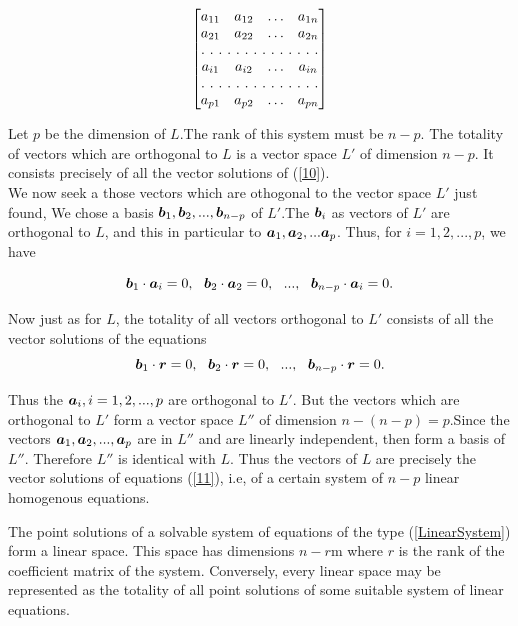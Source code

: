 \[
\begin{bmatrix}
a_{11} & a_{12}  & \hdots & a_{1n} \\
a_{21} & a_{22}  & \hdots & a_{2n} \\
\hdotsfor[2]{4}\\
a_{i1} & a_{i2}  & \hdots & a_{in}  \\
\hdotsfor[2]{4}\\
a_{p1} & a_{p2}  & \hdots & a_{pn}\\
\end{bmatrix}
\]

Let $p$ be the dimension of $L$.The rank of this system must be $n-p$. The totality of vectors which are orthogonal to $L$ is a vector space $L'$ of dimension $n-p$. It consists precisely of all the vector solutions of (\ref{10}).\\

We now seek a those vectors which are othogonal to the vector space $L'$ just found, We chose a basis $\boldsymbol{b}_1, \boldsymbol{b}_2, ..., \boldsymbol{b}_{n-p}$ of $L'$.The $\boldsymbol{b}_i$ as vectors of $L'$ are orthogonal to $L$, and this in particular to 
$\boldsymbol{a}_1, \boldsymbol{a}_2, ... \boldsymbol{a}_p$. Thus, for $i=1, 2, ..., p$, we have

$$\boldsymbol{b}_1 \cdot \boldsymbol{a}_i = 0, ~~\boldsymbol{b}_2 \cdot \boldsymbol{a}_2 = 0, ~~..., ~~\boldsymbol{b}_{n-p} \cdot \boldsymbol{a}_i = 0.$$

Now just as for $L$, the totality of all vectors orthogonal to $L'$ consists of all the vector solutions of the equations
\begin{equation}\boldsymbol{b}_1 \cdot \boldsymbol{r} = 0, ~~\boldsymbol{b}_2 \cdot \boldsymbol{r} = 0, ~~..., ~~\boldsymbol{b}_{n-p} \cdot \boldsymbol{r} = 0.\label{11}\end{equation}
 
 Thus the $\boldsymbol{a}_i, i =1,2, ..., p$ are orthogonal to $L'$. But the vectors which are orthogonal to $L'$ form a vector space $L''$ of dimension $n - (n-p) = p$.Since the vectors $\boldsymbol{a}_1, \boldsymbol{a}_2, ..., \boldsymbol{a}_p$ are in $L''$ and are 
 linearly independent, then form a basis of $L''$. Therefore $L''$ is identical with $L$. Thus the vectors of $L$ are precisely the vector solutions of equations (\ref{11}), i.e, of a certain system of $n-p$ linear homogenous equations.
 
 \begin{theorem}
 The point solutions of a solvable system of equations of the type (\ref{LinearSystem}) form a linear space. This space has dimensions $n-r$m where $r$ is the rank of the coefficient matrix of the system. Conversely, every linear
 space may be represented as the totality of all point solutions of some suitable system of linear equations. 
 \end{theorem}